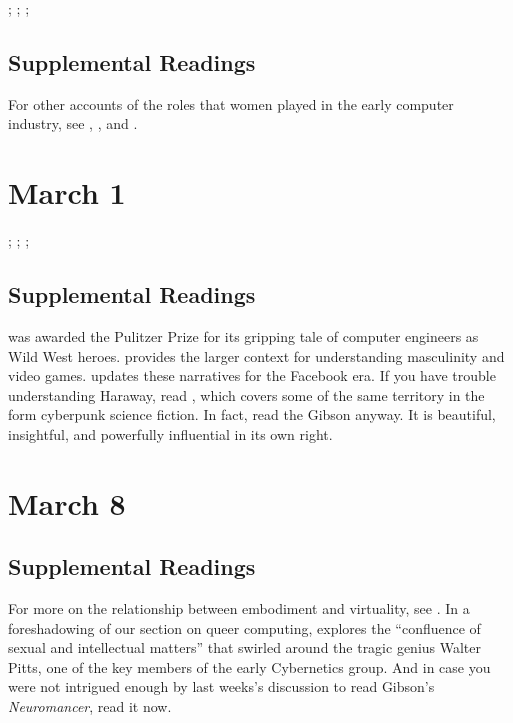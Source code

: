 \documentclass[11pt]{article}
\begin{document}
\cite{Nakamura:2014gp}; \cite{Ensmenger:2010tc}; \cite{Haraway:1991uz}; \cite{Bernstein:1980wf}


\subsection{Supplemental Readings}

For other accounts of the roles that women played in the early computer industry, see \cite{Shetterly:2016vl}, \cite{Grier:2005tq}, and \cite{Gurer:1996it}.


\section{March 1}

\cite[][(selected excerpts)]{Levy:1984ut}; \cite{Eglash:2002wk}; \cite{Lagesen:2008vy}; \cite{Ensmenger:2015wx}

\subsection{Supplemental Readings}

\cite{Kidder:1981tj} was awarded the Pulitzer Prize for its gripping tale of computer engineers as Wild West heroes. \cite{Kocurek:2015cg} provides the larger context for understanding masculinity and video games.   \cite{Losse:2012um} updates these narratives for the Facebook era. If you have trouble understanding Haraway, read \cite{Gibson:1995un}, which covers some of the same territory in the form cyberpunk science fiction.  In fact, read the Gibson anyway.  It is beautiful, insightful, and powerfully influential in its own right.



\section{March 8}

\cite{Hayles:2008wq}

\subsection{Supplemental Readings}

For more on the relationship between embodiment and virtuality, see \cite{Stone:1996wp}.  In a foreshadowing of our section on queer computing, \cite{Wilson:2009wm} explores the ``confluence of sexual and intellectual matters'' that swirled around the tragic genius Walter Pitts, one of the key members of the early Cybernetics group. And in case you were not intrigued enough by last weeks's discussion to read Gibson's \emph{Neuromancer}, read it now.
\end{document}
